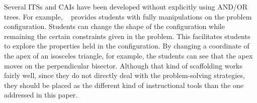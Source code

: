 Several ITSs and CAIs have been developed without explicitly using
AND/OR trees.  For example, \Cabri\ \cite{CABRI} provides students with
fully manipulations on the problem configuration.  Students can change
the shape of the configuration while remaining the certain constraints
given in the problem.  This facilitates students to explore the
properties held in the configuration.  By changing a coordinate of the
apex of an isosceles triangle, for example, the students can see that
the apex moves on the perpendicular bisector.  Although that kind of
scaffolding works fairly well, since they do not directly deal with the
problem-solving strategies, they should be placed as the different kind
of instructional tools than the one addressed in this paper.

